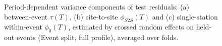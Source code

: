 \begin{figure}[htbp]
\centering
{}
\caption{Period-dependent variance components of test residuals: (a) between-event $\tau(T)$, (b) site-to-site $\phi_{S2S}(T)$ and (c) single-station within-event $\phi_0(T)$, estimated by crossed random effects on held-out events (Event split, full profile), averaged over folds.}
\label{fig:fig2_variance_components}
\end{figure}
